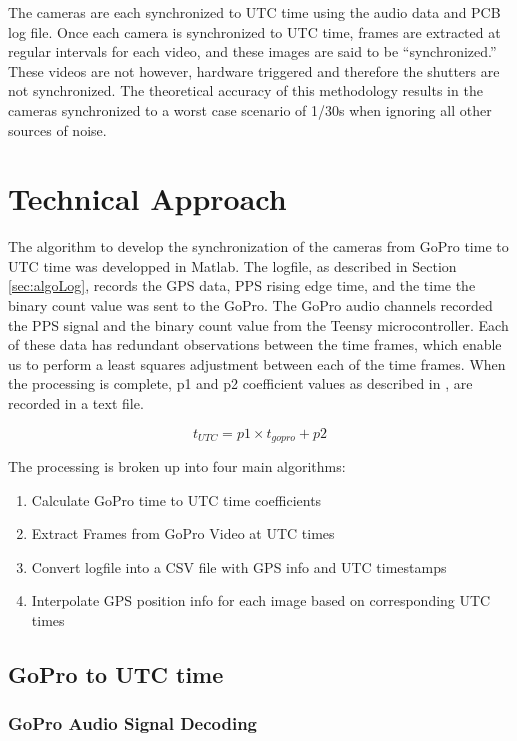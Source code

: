 	The cameras are each synchronized to UTC time using the audio data and PCB log file.  Once each camera is synchronized to UTC time, frames are extracted at regular intervals for each video, and these images are said to be ``synchronized.''  These videos are not however, hardware triggered and therefore the shutters are not synchronized.  The theoretical accuracy of this methodology results in the cameras synchronized to a worst case scenario of 1/30s when ignoring all other sources of noise.
	
	\section{Technical Approach}
	The algorithm to develop the synchronization of the cameras from GoPro time to UTC time was developped in Matlab.  The logfile, as described in Section \ref{sec:algoLog}, records the GPS data, PPS rising edge time, and the time the binary count value was sent to the GoPro.  The GoPro audio channels recorded the PPS signal and the binary count value from the Teensy microcontroller.  Each of these data has redundant observations between the time frames, which enable us to perform a least squares adjustment between each of the time frames.  When the processing is complete, p1 and p2 coefficient values as described in , are recorded in a text file.
	
	\begin{equation}
	\label{eqn:utc2gopro}
	t_{UTC} = p1 \times t_{gopro} + p2 
	\end{equation}
	
	The processing is broken up into four main algorithms:
	\begin{enumerate}
		\item Calculate GoPro time to UTC time coefficients
		\item Extract Frames from GoPro Video at UTC times 
		\item Convert logfile into a CSV file with GPS info and UTC timestamps
		\item Interpolate GPS position info for each image based on corresponding UTC times 
	\end{enumerate}

	\subsection{GoPro to UTC time}
	
	\subsubsection{GoPro Audio Signal Decoding}

